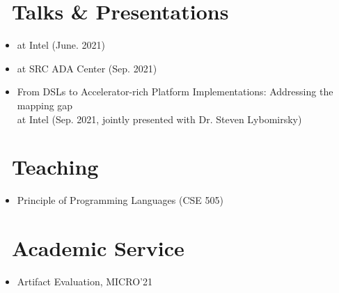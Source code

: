 \documentclass{resume}
\begin{document}
\section{\faSlideshare\ Talks \& Presentations}
\begin{itemize}
    \item {} at Intel (June. 2021)
    \item {} at SRC ADA Center (Sep. 2021)
    \item From DSLs to Accelerator-rich Platform Implementations: Addressing the mapping gap \\at Intel (Sep. 2021, jointly presented with Dr. Steven Lybomirsky)
\end{itemize}

\section{\faMortarBoard\ Teaching}
\begin{itemize}
    \item Principle of Programming Languages (CSE 505)
\end{itemize}

\section{\faUsers\ Academic Service}
\begin{itemize}
    \item Artifact Evaluation, MICRO'21
\end{itemize}
\end{document}
